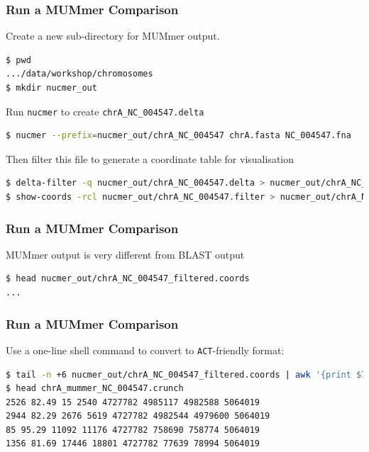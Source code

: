 \documentclass[table]{beamer}
\begin{document}
  \begin{frame}[fragile]
    \frametitle{Run a MUMmer Comparison}
    Create a new sub-directory for MUMmer output.
\begin{lstlisting}[language=bash]
$ pwd
.../data/workshop/chromosomes
$ mkdir nucmer_out
\end{lstlisting}
    Run \texttt{nucmer} to create \texttt{chrA\_NC\_004547.delta} \\
\begin{lstlisting}[language=bash]
$ nucmer --prefix=nucmer_out/chrA_NC_004547 chrA.fasta NC_004547.fna
\end{lstlisting}
    Then filter this file to generate a coordinate table for visualisation
\begin{lstlisting}[language=bash]
$ delta-filter -q nucmer_out/chrA_NC_004547.delta > nucmer_out/chrA_NC_004547.filter
$ show-coords -rcl nucmer_out/chrA_NC_004547.filter > nucmer_out/chrA_NC_004547_filtered.coords
\end{lstlisting}
\end{frame}

  \begin{frame}[fragile]
    \frametitle{Run a MUMmer Comparison}
    MUMmer output is very different from BLAST output
\begin{lstlisting}[language=bash]
$ head nucmer_out/chrA_NC_004547_filtered.coords
...
\end{lstlisting}
\end{frame}

  \begin{frame}[fragile]
    \frametitle{Run a MUMmer Comparison}
    Use a one-line shell command to convert to \texttt{ACT}-friendly format:
\begin{lstlisting}[language=bash]
$ tail -n +6 nucmer_out/chrA_NC_004547_filtered.coords | awk '{print $7" "$10" "$1" "$2" "$12" "$4" "$5" "$13}' > chrA_mummer_NC_004547.crunch
$ head chrA_mummer_NC_004547.crunch 
2526 82.49 15 2540 4727782 4985117 4982588 5064019
2944 82.29 2676 5619 4727782 4982544 4979600 5064019
85 95.29 11092 11176 4727782 758690 758774 5064019
1356 81.69 17446 18801 4727782 77639 78994 5064019
\end{lstlisting}
\end{frame}
\end{document}
